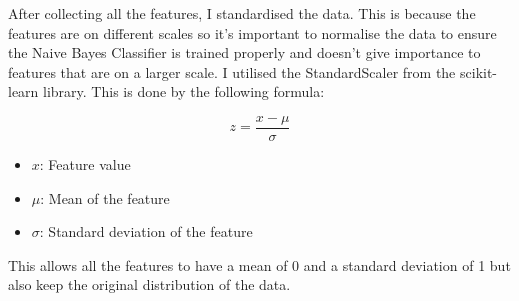 After collecting all the features, I standardised the data. This is because the features are on different scales so it's important to normalise the data to ensure the Naive Bayes Classifier is trained properly and doesn't give importance to features that are on a larger scale. I utilised the StandardScaler from the scikit-learn library. This is done by the following formula:

\begin{equation}
    \label{eq:standardisation}
    z = \frac{x - \mu}{\sigma}
\end{equation}

\begin{itemize}
    \item $x$: Feature value
    \item $\mu$: Mean of the feature
    \item $\sigma$: Standard deviation of the feature
\end{itemize}

This allows all the features to have a mean of 0 and a standard deviation of 1 but also keep the original distribution of the data.
